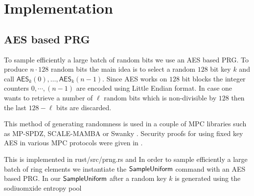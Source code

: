 \section{Implementation}

\subsection{AES based PRG}
\label{sec:aes}

To sample efficiently a large batch of random bits we use an AES based PRG. 
To produce $n \cdot 128$ random bits the main idea is to select a random $128$ bit
key $k$ and call $\mathsf{AES}_k(0), \dots, \mathsf{AES}_k(n-1)$. Since AES works
on $128$ bit blocks the integer counters $0, \cdots, (n-1)$ are encoded using Little Endian format.
In case one wants to retrieve a number of $\ell$ random bits which is non-divisible by $128$ then
the last $128 - \ell$ bits are discarded.

This method of generating
randomness is used in a couple of MPC libraries such as MP-SPDZ, SCALE-MAMBA or Swanky \cite{url-swanky}.
Security proofs for using fixed key AES in various MPC protocols were given in \cite{xiao-paper}.

This is implemented in \textsf{rust/src/prng.rs} and 
In order to sample efficiently a large batch of ring elements we instantiate
the $\mathsf{SampleUniform}$ command with an AES based PRG. 
In our $\mathsf{SampleUniform}$ after a random key $k$ is generated using the sodiuomxide entropy pool


